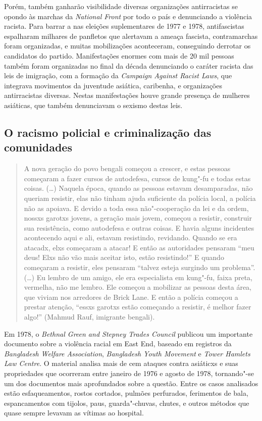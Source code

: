 Porém, também ganharão visibilidade diversas organizações antirracistas se opondo às marchas da \emph{National Front} por todo o país e denunciando a violência racista. Para barrar a  nas eleições suplementares de 1977 e 1978, antifascistas espalharam milhares de panfletos que alertavam a ameaça fascista, contramarchas foram organizadas, e muitas mobilizações aconteceram, conseguindo derrotar os candidatos do partido. Manifestações enormes com mais de 20 mil pessoas também foram organizadas no final da década denunciando o caráter racista das leis de imigração, com a formação da \emph{Campaign Against Racist Laws}, que integrava movimentos da juventude asiática, caribenha, e organizações antirracistas diversas. Nestas manifestações houve grande presença de mulheres asiáticas, que também denunciavam o sexismo destas leis.

\subsection{O racismo policial e criminalização das comunidades}

\begin{quote}
A nova geração do povo bengali começou a crescer, e estas pessoas começaram a fazer cursos de autodefesa, cursos de kung"-fu e todas estas coisas. (\ldots{}) Naquela época, quando as pessoas estavam desamparadas, não queriam resistir, elas não tinham ajuda suficiente da polícia local, a polícia não as apoiava. E devido a toda essa não"-cooperação da lei e da ordem, nossxs garotxs jovens, a geração mais jovem, começou a resistir, construir sua resistência, como autodefesa e outras coisas. E havia alguns incidentes acontecendo aqui e ali, estavam resistindo, revidando. Quando se era atacadx, elxs começaram a atacar! E então as autoridades pensaram ``meu deus! Elxs não vão mais aceitar isto, estão resistindo!'' E quando começaram a resistir, eles pensaram ``talvez esteja surgindo um problema''. (\ldots{}) Eu lembro de um amigo, ele era especialista em kung"-fu, faixa preta, vermelha, não me lembro. Ele começou a mobilizar as pessoas desta área, que viviam nos arredores de Brick Lane. E então a polícia começou a prestar atenção, ``essxs garotxs estão começando a resistir, é melhor fazer algo!'' (Mahmud Rauf, imigrante bengali).
\end{quote}

Em 1978, o \emph{Bethnal Green and Stepney Trades Council} publicou um importante documento sobre a violência racial em East End, baseado em registros da \emph{Bangladesh Welfare Association}, \emph{Bangladesh Youth Movement} e \emph{Tower Hamlets Law Centre}. O material analisa mais de cem ataques contra asiáticxs e suas propriedades que ocorreram entre janeiro de 1976 e agosto de 1978, tornando"-se um dos documentos mais aprofundados sobre a questão. Entre os casos analisados estão esfaqueamentos, rostos cortados, pulmões perfurados, ferimentos de bala, espancamentos com tijolos, paus, guarda"-chuvas, chutes, e outros métodos que quase sempre levavam as vítimas ao hospital.


